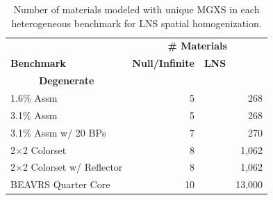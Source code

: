 \begin{table}[h!]
  \centering
  \caption[Number of materials for LNS spatial homogenization]{Number of materials modeled with unique \ac{MGXS} in each heterogeneous benchmark for \ac{LNS} spatial homogenization.}
  \small
  \label{table:chap9-num-materials-lns}
  \vspace{6pt}
  \begin{tabular}{l r r r}
  \toprule
  \rowcolor{lightgray}
  & \multicolumn{3}{c}{\cellcolor{lightgray} \bf \# Materials} \\
  \multirow{-2}{*}{\cellcolor{lightgray} \bf Benchmark} &
  \multicolumn{1}{c}{\cellcolor{lightgray} \bf Null/Infinite} &
  \multicolumn{1}{c}{\cellcolor{lightgray} \bf \ac{LNS}} \\
  \multicolumn{1}{c}{\cellcolor{lightgray} \bf Degenerate} \\
  \midrule
1.6\% Assm & 5 & & 268 \\
  \midrule
3.1\% Assm & 5 & & 268 \\
  \midrule
3.1\% Assm w/ 20 BPs & 7 & & 270  \\
  \midrule
2$\times$2 Colorset & 8 & & 1,062 \\
  \midrule
2$\times$2 Colorset w/ Reflector & 8 & & 1,062 \\
  \midrule
\ac{BEAVRS} Quarter Core & 10 & & 13,000 \\ %
  \bottomrule
\end{tabular}
\end{table}


